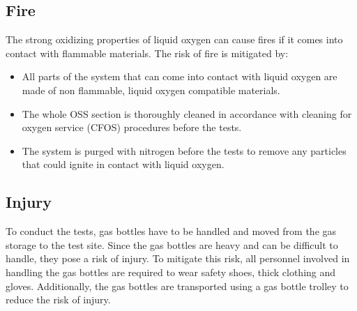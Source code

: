 \documentclass{article}
\begin{document}
\subsection{Fire}
The strong oxidizing properties of liquid oxygen can cause fires if it comes into contact with flammable materials. The risk of fire is mitigated by:
\begin{itemize}
    \item All parts of the system that can come into contact with liquid oxygen are made of non flammable, liquid oxygen compatible materials.
    \item The whole OSS section is thoroughly cleaned in accordance with cleaning for oxygen service (CFOS) procedures before the tests.
    \item The system is purged with nitrogen before the tests to remove any particles that could ignite in contact with liquid oxygen.
\end{itemize}

\subsection{Injury}
To conduct the tests, gas bottles have to be handled and moved from the gas storage to the test site. Since the gas bottles are heavy and can be difficult to handle, they pose a risk of injury. To mitigate this risk, all personnel involved in handling the gas bottles are required to wear safety shoes, thick clothing and gloves. Additionally, the gas bottles are transported using a gas bottle trolley to reduce the risk of injury.
\end{document}
